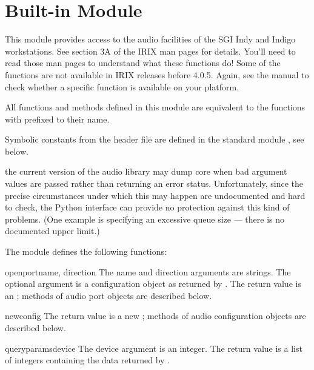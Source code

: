 \section{Built-in Module }



This module provides access to the audio facilities of the SGI Indy
and Indigo workstations.  See section 3A of the IRIX man pages for
details.  You'll need to read those man pages to understand what these
functions do!  Some of the functions are not available in IRIX
releases before 4.0.5.  Again, see the manual to check whether a
specific function is available on your platform.

All functions and methods defined in this module are equivalent to
the \C{} functions with  prefixed to their name.

Symbolic constants from the \C{} header file  are
defined in the standard module , see
below.

 the current version of the audio library may dump core
when bad argument values are passed rather than returning an error
status.  Unfortunately, since the precise circumstances under which
this may happen are undocumented and hard to check, the Python
interface can provide no protection against this kind of problems.
(One example is specifying an excessive queue size --- there is no
documented upper limit.)

The module defines the following functions:


\begin{funcdesc}{openport}{name, direction}
The name and direction arguments are strings.  The optional
 argument is a configuration object as returned by
.  The return value is an ; methods of audio port objects are described below.
\end{funcdesc}

\begin{funcdesc}{newconfig}{}
The return value is a new ; methods of
audio configuration objects are described below.
\end{funcdesc}

\begin{funcdesc}{queryparams}{device}
The device argument is an integer.  The return value is a list of
integers containing the data returned by .
\end{funcdesc}

